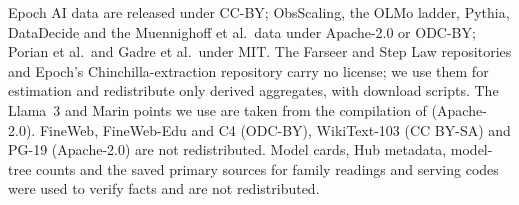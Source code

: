 Epoch AI data are released under CC-BY; ObsScaling, the OLMo ladder, Pythia, DataDecide and the Muennighoff et al.\ data
under Apache-2.0 or ODC-BY; Porian et al.\ and Gadre et al.\ under MIT. The Farseer and Step Law repositories and
Epoch's Chinchilla-extraction repository carry no license; we use them for estimation and redistribute only derived
aggregates, with download scripts. The Llama~3 and Marin points we use are taken from the compilation of
\citet{openathena2026isoflop} (Apache-2.0). FineWeb, FineWeb-Edu and C4 (ODC-BY), WikiText-103 (CC BY-SA) and
PG-19 (Apache-2.0) are not redistributed. Model cards, Hub metadata, model-tree counts and the saved primary sources for family
readings and serving codes were used to verify facts and are not redistributed.
